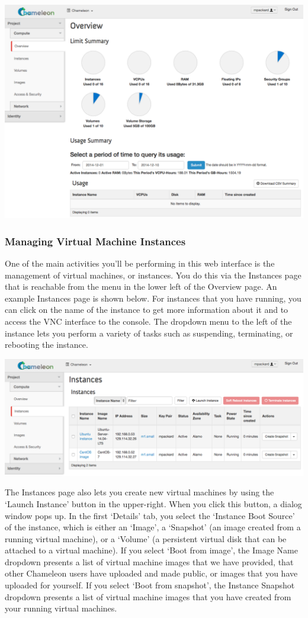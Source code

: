 \includegraphics[width=0.8\columnwidth]{images/chameleon/openstack_alamo_overview.png}

\subsubsection{Managing Virtual Machine Instances}\label{managing-virtual-machine-instances}

One of the main activities you'll be performing in this web interface is
the management of virtual machines, or instances. You do this via the
Instances page that is reachable from the menu in the lower left of the
Overview page. An example Instances page is shown below. For instances
that you have running, you can click on the name of the instance to get
more information about it and to access the VNC interface to the
console. The dropdown menu to the left of the instance lets you perform
a variety of tasks such as suspending, terminating, or rebooting the
instance.

\includegraphics[width=0.8\columnwidth]{images/chameleon/openstack_alamo_instances.png}

The Instances page also lets you create new virtual machines by using
the `Launch Instance' button in the upper-right. When you click this
button, a dialog window pops up. In the first `Details' tab, you select
the `Instance Boot Source' of the instance, which is either an `Image',
a `Snapshot' (an image created from a running virtual machine), or a
`Volume' (a persistent virtual disk that can be attached to a virtual
machine). If you select `Boot from image', the Image Name dropdown
presents a list of virtual machine images that we have provided, that
other Chameleon users have uploaded and made public, or images that you
have uploaded for yourself. If you select `Boot from snapshot', the
Instance Snapshot dropdown presents a list of virtual machine images
that you have created from your running virtual machines.

